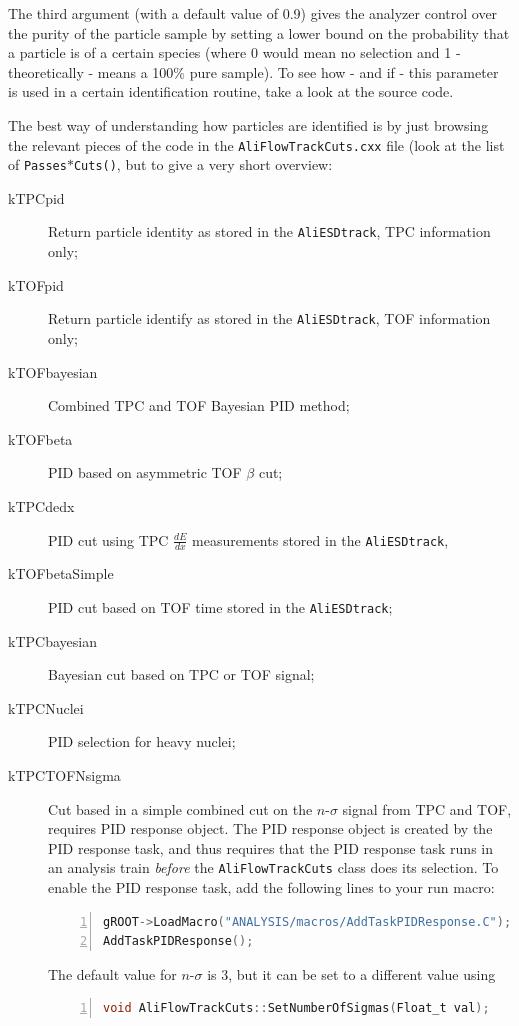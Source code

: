 \documentclass[a4paper]{book}
\numberwithin{equation}{subsection}
\begin{document}
The third argument (with a default value of 0.9) gives the analyzer control over the purity of the particle sample by setting a lower bound on the probability that a particle is of a certain species (where 0 would mean no selection and 1 -theoretically - means a 100\% pure sample). To see how - and if - this parameter is used in a certain identification routine, take a look at the source code.
                   
The best way of understanding how particles are identified is by just browsing the relevant pieces of the code in the \texttt{AliFlowTrackCuts.cxx} file (look at the list of \texttt{Passes$\ast$Cuts()}, but to give a very short overview:
\begin{description}
\item[kTPCpid] Return particle identity as stored in the \texttt{AliESDtrack}, TPC information only;
\item[kTOFpid] Return particle identify as stored in the \texttt{AliESDtrack}, TOF information only;
\item[kTOFbayesian] Combined TPC and TOF Bayesian PID method;
\item[kTOFbeta] PID based on asymmetric TOF $\beta$ cut;
\item[kTPCdedx] PID cut using TPC $\frac{dE}{dx}$ measurements stored in the \texttt{AliESDtrack},
\item[kTOFbetaSimple] PID cut based on TOF time stored in the \texttt{AliESDtrack};
\item[kTPCbayesian] Bayesian cut based on TPC or TOF signal;
\item[kTPCNuclei] PID selection for heavy nuclei;
\item[kTPCTOFNsigma]  Cut based in a simple combined cut on the $n$-$\sigma$ signal from TPC and TOF, requires PID response object. The PID response object is created by the PID response task, and thus requires that the PID response task runs in an analysis train \emph{before} the \texttt{AliFlowTrackCuts} class does its selection. To enable the PID response task, add the following lines to your run macro:
\begin{lstlisting}[language=C, numbers=left]
gROOT->LoadMacro("ANALYSIS/macros/AddTaskPIDResponse.C");
AddTaskPIDResponse();\end{lstlisting}
The default value for $n$-$\sigma$ is 3, but it can be set to a different 
value using
\begin{lstlisting}[language=C, numbers=left]
void AliFlowTrackCuts::SetNumberOfSigmas(Float_t val);\end{lstlisting}
\end{description}
\end{document}

